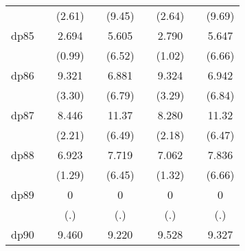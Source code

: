 {\begin{tabular}{l*{8}{c}}
            &                     &      (2.61)         &                     &      (9.45)         &                     &      (2.64)         &                     &      (9.69)         \\
[1em]
dp85        &                     &       2.694         &                     &       5.605\sym{***}&                     &       2.790         &                     &       5.647\sym{***}\\
            &                     &      (0.99)         &                     &      (6.52)         &                     &      (1.02)         &                     &      (6.66)         \\
[1em]
dp86        &                     &       9.321\sym{***}&                     &       6.881\sym{***}&                     &       9.324\sym{**} &                     &       6.942\sym{***}\\
            &                     &      (3.30)         &                     &      (6.79)         &                     &      (3.29)         &                     &      (6.84)         \\
[1em]
dp87        &                     &       8.446\sym{*}  &                     &       11.37\sym{***}&                     &       8.280\sym{*}  &                     &       11.32\sym{***}\\
            &                     &      (2.21)         &                     &      (6.49)         &                     &      (2.18)         &                     &      (6.47)         \\
[1em]
dp88        &                     &       6.923         &                     &       7.719\sym{***}&                     &       7.062         &                     &       7.836\sym{***}\\
            &                     &      (1.29)         &                     &      (6.45)         &                     &      (1.32)         &                     &      (6.66)         \\
[1em]
dp89        &                     &           0         &                     &           0         &                     &           0         &                     &           0         \\
            &                     &         (.)         &                     &         (.)         &                     &         (.)         &                     &         (.)         \\
[1em]
dp90        &                     &       9.460\sym{***}&                     &       9.220\sym{***}&                     &       9.528\sym{***}&                     &       9.327\sym{***}\\

\end{tabular}}
